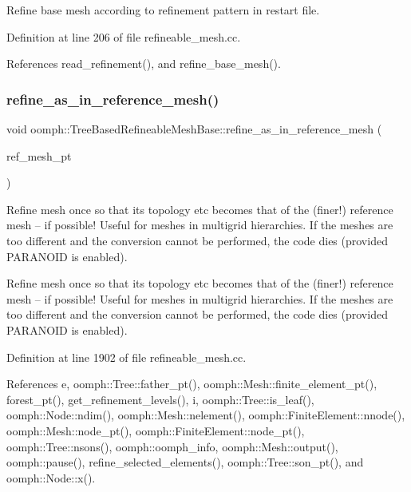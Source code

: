 Refine base mesh according to refinement pattern in restart file. 

Definition at line 206 of file refineable\+\_\+mesh.\+cc.



References read\+\_\+refinement(), and refine\+\_\+base\+\_\+mesh().

\mbox{\label{classoomph_1_1TreeBasedRefineableMeshBase_a7451ff312a3ac482b2f62ded020630c3}} 
\subsubsection{\texorpdfstring{refine\+\_\+as\+\_\+in\+\_\+reference\+\_\+mesh()}{refine\_as\_in\_reference\_mesh()}}
{\footnotesize\ttfamily void oomph\+::\+Tree\+Based\+Refineable\+Mesh\+Base\+::refine\+\_\+as\+\_\+in\+\_\+reference\+\_\+mesh (\begin{DoxyParamCaption}\item[{\hyperlink{classoomph_1_1TreeBasedRefineableMeshBase}{Tree\+Based\+Refineable\+Mesh\+Base} $\ast$const \&}]{ref\+\_\+mesh\+\_\+pt }\end{DoxyParamCaption})\hspace{0.3cm}{\ttfamily [virtual]}}



Refine mesh once so that its topology etc becomes that of the (finer!) reference mesh -- if possible! Useful for meshes in multigrid hierarchies. If the meshes are too different and the conversion cannot be performed, the code dies (provided P\+A\+R\+A\+N\+O\+ID is enabled). 

Refine mesh once so that its topology etc becomes that of the (finer!) reference mesh -- if possible! Useful for meshes in multigrid hierarchies. If the meshes are too different and the conversion cannot be performed, the code dies (provided P\+A\+R\+A\+N\+O\+ID is enabled). 

Definition at line 1902 of file refineable\+\_\+mesh.\+cc.



References e, oomph\+::\+Tree\+::father\+\_\+pt(), oomph\+::\+Mesh\+::finite\+\_\+element\+\_\+pt(), forest\+\_\+pt(), get\+\_\+refinement\+\_\+levels(), i, oomph\+::\+Tree\+::is\+\_\+leaf(), oomph\+::\+Node\+::ndim(), oomph\+::\+Mesh\+::nelement(), oomph\+::\+Finite\+Element\+::nnode(), oomph\+::\+Mesh\+::node\+\_\+pt(), oomph\+::\+Finite\+Element\+::node\+\_\+pt(), oomph\+::\+Tree\+::nsons(), oomph\+::oomph\+\_\+info, oomph\+::\+Mesh\+::output(), oomph\+::pause(), refine\+\_\+selected\+\_\+elements(), oomph\+::\+Tree\+::son\+\_\+pt(), and oomph\+::\+Node\+::x().

